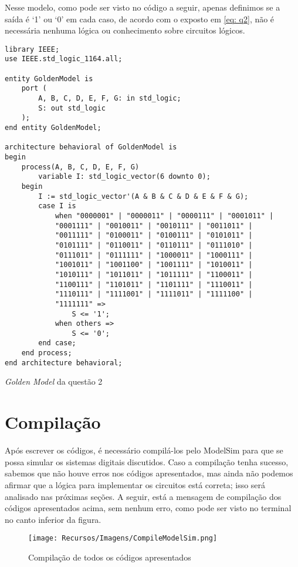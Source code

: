 \documentclass[a4paper,12pt]{article}
\newenvironment{code}{\captionsetup{type=listing}}{}
\begin{document}
Nesse modelo, como pode ser visto no código a seguir, apenas definimos se a saída é `1' ou `0' em cada caso, de acordo com o exposto em \eqref{eq: q2}, não é necessária nenhuma lógica ou conhecimento sobre circuitos lógicos.

\begin{code}
    \begin{verbatim}
library IEEE;
use IEEE.std_logic_1164.all;

entity GoldenModel is
    port (
        A, B, C, D, E, F, G: in std_logic;
        S: out std_logic
    );
end entity GoldenModel;

architecture behavioral of GoldenModel is
begin
    process(A, B, C, D, E, F, G)
        variable I: std_logic_vector(6 downto 0);
    begin
        I := std_logic_vector'(A & B & C & D & E & F & G);
        case I is 
            when "0000001" | "0000011" | "0000111" | "0001011" |
            "0001111" | "0010011" | "0010111" | "0011011" |
            "0011111" | "0100011" | "0100111" | "0101011" |
            "0101111" | "0110011" | "0110111" | "0111010" |
            "0111011" | "0111111" | "1000011" | "1000111" |
            "1001011" | "1001100" | "1001111" | "1010011" |
            "1010111" | "1011011" | "1011111" | "1100011" |
            "1100111" | "1101011" | "1101111" | "1110011" |
            "1110111" | "1111001" | "1111011" | "1111100" |
            "1111111" => 
                S <= '1';
            when others => 
                S <= '0';
        end case;
    end process;
end architecture behavioral;
    \end{verbatim}
    \caption{\textit{Golden Model} da questão 2}
\end{code}

\newpage

\section{Compilação}
Após escrever os códigos, é necessário compilá-los pelo ModelSim para que se possa simular os sistemas digitais discutidos. Caso a compilação tenha sucesso, sabemos que não houve erros nos códigos apresentados, mas ainda não podemos afirmar que a lógica para implementar os circuitos está correta; isso será analisado nas próximas seções. A seguir, está a mensagem de compilação dos códigos apresentados acima, sem nenhum erro, como pode ser visto no terminal no canto inferior da figura.

\begin{figure}[H]
    \centering
    \texttt{[image: Recursos/Imagens/CompileModelSim.png]}
    \caption{Compilação de todos os códigos apresentados}
\end{figure}
\end{document}
